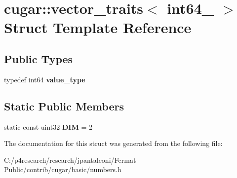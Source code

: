 \hypertarget{structcugar_1_1vector__traits_3_01int64__2_01_4}{}\section{cugar\+:\+:vector\+\_\+traits$<$ int64\+\_ $>$ Struct Template Reference}
\label{structcugar_1_1vector__traits_3_01int64__2_01_4}
\subsection*{Public Types}
\begin{DoxyCompactItemize}
\item 
\mbox{\label{structcugar_1_1vector__traits_3_01int64__2_01_4_aefcb1582a75985877deebac35ee071a6}} 
typedef int64 {\bfseries value\+\_\+type}
\end{DoxyCompactItemize}
\subsection*{Static Public Members}
\begin{DoxyCompactItemize}
\item 
\mbox{\label{structcugar_1_1vector__traits_3_01int64__2_01_4_a44652757532cbff7d3a20ccbb5f2d44b}} 
static const uint32 {\bfseries D\+IM} = 2
\end{DoxyCompactItemize}


The documentation for this struct was generated from the following file\+:\begin{DoxyCompactItemize}
\item 
C\+:/p4research/research/jpantaleoni/\+Fermat-\/\+Public/contrib/cugar/basic/numbers.\+h\end{DoxyCompactItemize}
